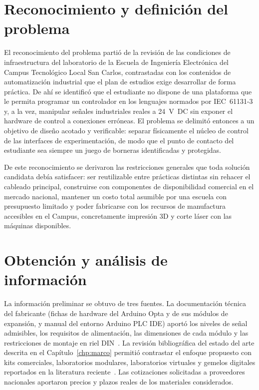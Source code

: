 \documentclass[12pt,a4paper,oneside]{report}
\begin{document}
\section{Reconocimiento y definición del problema}

El reconocimiento del problema partió de la revisión de las condiciones de infraestructura del laboratorio de la Escuela de Ingeniería Electrónica del Campus Tecnológico Local San Carlos, contrastadas con los contenidos de automatización industrial que el plan de estudios exige desarrollar de forma práctica. De ahí se identificó que el estudiante no dispone de una plataforma que le permita programar un controlador en los lenguajes normados por IEC~61131-3 y, a la vez, manipular señales industriales reales a 24~V~DC sin exponer el hardware de control a conexiones erróneas. El problema se delimitó entonces a un objetivo de diseño acotado y verificable: separar físicamente el núcleo de control de las interfaces de experimentación, de modo que el punto de contacto del estudiante sea siempre un juego de borneras identificadas y protegidas.

De este reconocimiento se derivaron las restricciones generales que toda solución candidata debía satisfacer: ser reutilizable entre prácticas distintas sin rehacer el cableado principal, construirse con componentes de disponibilidad comercial en el mercado nacional, mantener un costo total asumible por una escuela con presupuesto limitado y poder fabricarse con los recursos de manufactura accesibles en el Campus, concretamente impresión 3D y corte láser con las máquinas disponibles. 

\section{Obtención y análisis de información}

La información preliminar se obtuvo de tres fuentes. La documentación técnica del fabricante (fichas de hardware del Arduino Opta y de sus módulos de expansión, y manual del entorno Arduino PLC IDE) aportó los niveles de señal admisibles, los requisitos de alimentación, las dimensiones de cada módulo y las restricciones de montaje en riel DIN~\cite{ref1,ref8}. La revisión bibliográfica del estado del arte descrita en el Capítulo~\ref{chp:marco} permitió contrastar el enfoque propuesto con kits comerciales, laboratorios modulares, laboratorios virtuales y gemelos digitales reportados en la literatura reciente~\cite{ref3,ref4,ref10,ref11}. Las cotizaciones solicitadas a proveedores nacionales aportaron precios y plazos reales de los materiales considerados.
\end{document}
